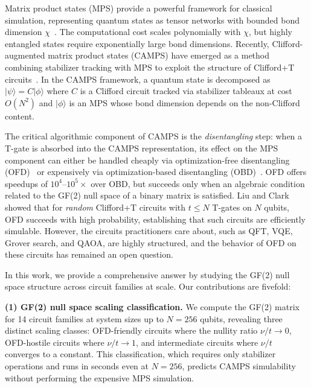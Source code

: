 \documentclass[a4paper,twocolumn,11pt]{quantumarticle}
\begin{document}
Matrix product states (MPS) provide a powerful framework for classical simulation, representing quantum states as tensor networks with bounded bond dimension $\chi$~\cite{Schollwock2011,White1992,Vidal2003}.
The computational cost scales polynomially with $\chi$, but highly entangled states require exponentially large bond dimensions.
Recently, Clifford-augmented matrix product states (CAMPS) have emerged as a method combining stabilizer tracking with MPS to exploit the structure of Clifford+T circuits~\cite{Liu2024,Qian2024,MelloTDVP2025,Mello2024}.
In the CAMPS framework, a quantum state is decomposed as $|\psi\rangle = C|\phi\rangle$ where $C$ is a Clifford circuit tracked via stabilizer tableaux at cost $O(N^2)$ and $|\phi\rangle$ is an MPS whose bond dimension depends on the non-Clifford content.

The critical algorithmic component of CAMPS is the \emph{disentangling} step: when a T-gate is absorbed into the CAMPS representation, its effect on the MPS component can either be handled cheaply via optimization-free disentangling (OFD)~\cite{Liu2024} or expensively via optimization-based disentangling (OBD)~\cite{Qian2024}.
OFD offers speedups of $10^4$--$10^5\times$ over OBD, but succeeds only when an algebraic condition related to the GF(2) null space of a binary matrix is satisfied.
Liu and Clark~\cite{Liu2024} showed that for \emph{random} Clifford+T circuits with $t \le N$ T-gates on $N$ qubits, OFD succeeds with high probability, establishing that such circuits are efficiently simulable.
However, the circuits practitioners care about, such as QFT, VQE, Grover search, and QAOA, are highly structured, and the behavior of OFD on these circuits has remained an open question.

In this work, we provide a comprehensive answer by studying the GF(2) null space structure across circuit families at scale.
Our contributions are fivefold:

\textbf{(1) GF(2) null space scaling classification.}
We compute the GF(2) matrix for 14 circuit families at system sizes up to $N = 256$ qubits, revealing three distinct scaling classes: OFD-friendly circuits where the nullity ratio $\nu/t \to 0$, OFD-hostile circuits where $\nu/t \to 1$, and intermediate circuits where $\nu/t$ converges to a constant.
This classification, which requires only stabilizer operations and runs in seconds even at $N = 256$, predicts CAMPS simulability without performing the expensive MPS simulation.
\end{document}

